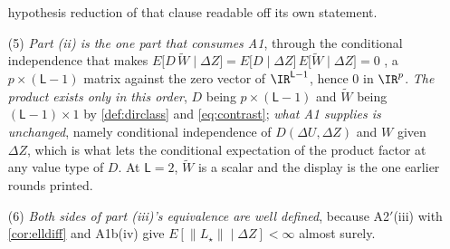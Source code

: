 \begin{remark}
\begin{enumerate}
hypothesis reduction of that clause readable off its own statement.
\item[(5)] \emph{Part (ii) is the one part that consumes A1}, through the conditional independence that
makes $E\big[D\,\widetilde W\mid\Delta Z\big]=E\big[D\mid\Delta Z\big]\,E\big[\widetilde W\mid\Delta Z\big]=0$
, a $p\times(\mathsf L-1)$ matrix against the zero vector of $\IR^{\mathsf L-1}$, hence $0$ in $\IR^{p}$.
\emph{The product exists only in this order}, $D$ being $p\times(\mathsf L-1)$ and $\widetilde W$ being
$(\mathsf L-1)\times1$ by \cref{def:dirclass} and \eqref{eq:contrast}; \emph{what A1 supplies is
unchanged}, namely conditional independence of $D(\Delta U,\Delta Z)$ and $W$ given $\Delta Z$, which is
what lets the conditional expectation of the product factor at any value type of $D$. At
$\mathsf L=2$, $\widetilde W$ is a scalar and the display is the one earlier rounds printed.
\item[(6)] \emph{Both sides of part (iii)'s equivalence are well defined}, because A2$'$(iii) with
\cref{cor:elldiff} and A1b(iv) give $E[\|L_\star\|\mid\Delta Z]<\infty$ almost surely.
\end{enumerate}
\end{remark}

